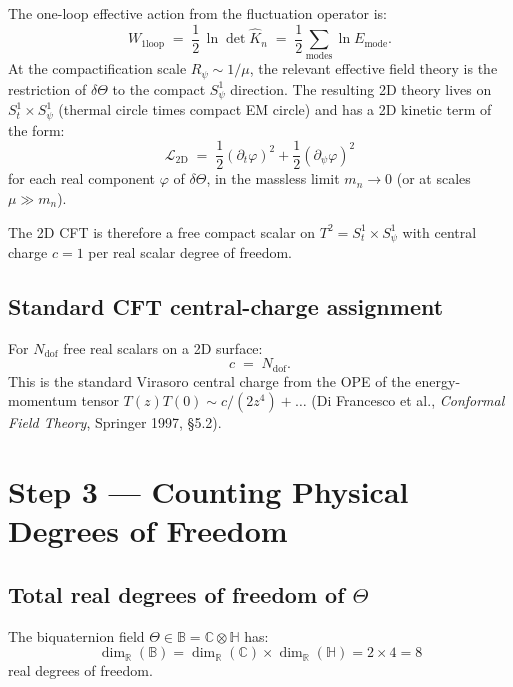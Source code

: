 \documentclass[12pt,a4paper]{article}
\theoremstyle{remark}
\newcommand{\BB}{\mathbb{B}}
\newcommand{\CC}{\mathbb{C}}
\newcommand{\RR}{\mathbb{R}}
\newcommand{\HH}{\mathbb{H}}
\begin{document}
The one-loop effective action from the fluctuation operator is:
\begin{equation}
  W_{\mathrm{1loop}} \;=\; \frac{1}{2}\,\ln\det\hat{K}_n
  \;=\; \frac{1}{2}\sum_{\text{modes}} \ln E_{\text{mode}}.
  \label{eq:W_1loop}
\end{equation}
At the compactification scale $R_\psi \sim 1/\mu$, the relevant effective
field theory is the restriction of $\delta\Theta$ to the compact $S^1_\psi$
direction.  The resulting 2D theory lives on $S^1_t \times S^1_\psi$
(thermal circle times compact EM circle) and has a 2D kinetic term of the form:
\begin{equation}
  \mathcal{L}_{\mathrm{2D}} \;=\; \frac{1}{2}(\partial_t\varphi)^2
  + \frac{1}{2}(\partial_\psi\varphi)^2
  \label{eq:2D_kin}
\end{equation}
for each real component $\varphi$ of $\delta\Theta$, in the massless limit
$m_n \to 0$ (or at scales $\mu \gg m_n$).

The 2D CFT is therefore a free compact scalar on $T^2 = S^1_t \times S^1_\psi$
with central charge $c = 1$ per real scalar degree of freedom.

\subsection{Standard CFT central-charge assignment}

For $N_{\mathrm{dof}}$ free real scalars on a 2D surface:
\begin{equation}
  c \;=\; N_{\mathrm{dof}}.
  \label{eq:c_formula}
\end{equation}
This is the standard Virasoro central charge from the OPE of the energy-momentum
tensor $T(z)T(0) \sim c/(2z^4) + \ldots$ (Di Francesco et al.,
\emph{Conformal Field Theory}, Springer 1997, §5.2).

\section{Step 3 — Counting Physical Degrees of Freedom}
\label{sec:dof}

\subsection{Total real degrees of freedom of $\Theta$}

The biquaternion field $\Theta \in \BB = \CC\otimes\HH$ has:
\begin{equation}
  \dim_\RR(\BB) = \dim_\RR(\CC)\times\dim_\RR(\HH) = 2\times 4 = 8
  \label{eq:dim_total}
\end{equation}
real degrees of freedom.
\end{document}
